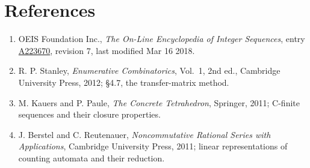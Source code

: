 \documentclass[11pt]{article}
\theoremstyle{definition}
\begin{document}
\section{References}

\begin{enumerate}

\item OEIS Foundation Inc., \emph{The On-Line Encyclopedia of Integer Sequences}, entry \href{https://oeis.org/A223670}{A223670}, revision 7, last modified Mar 16 2018.

\item R. P. Stanley, \emph{Enumerative Combinatorics}, Vol.~1, 2nd ed., Cambridge University Press, 2012; \S4.7, the transfer-matrix method.

\item M. Kauers and P. Paule, \emph{The Concrete Tetrahedron}, Springer, 2011; C-finite sequences and their closure properties.

\item J. Berstel and C. Reutenauer, \emph{Noncommutative Rational Series with Applications}, Cambridge University Press, 2011; linear representations of counting automata and their reduction.

\end{enumerate}
\end{document}
